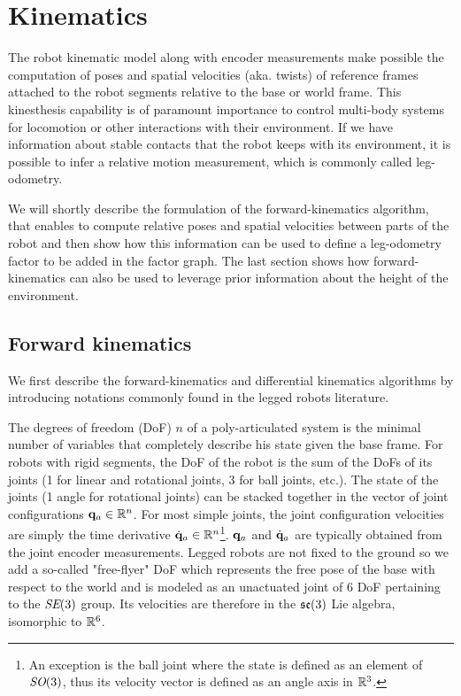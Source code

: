 \chapter{Kinematics}
\minitoc
\bigskip

The robot kinematic model along with encoder measurements make possible the computation of poses and spatial velocities \cite{featherstone2014rigid} (aka. twists) 
of reference frames attached to the robot segments relative to the base or world frame. This kinesthesis capability is of paramount importance to control
multi-body systems for locomotion or other interactions with their environment. If we have information about stable contacts that the robot keeps with
its environment, it is possible to infer a relative motion measurement, which is commonly called leg-odometry.

We will shortly describe the formulation of the forward-kinematics algorithm, that enables to compute relative poses and spatial velocities between parts of the robot
and then show how this information can be used to define a leg-odometry factor to be added in the factor graph. The last section shows how forward-kinematics can also be used to leverage prior 
information about the height of the environment. 



\section{Forward kinematics}
\label{sec:forward_kinematics}
We first describe the forward-kinematics and differential kinematics algorithms by introducing notations commonly found in the legged robots literature.

The degrees of freedom (DoF) $n$ of a poly-articulated system is the minimal number of variables that completely describe his state given the base frame. 
For robots with rigid segments, the DoF of the robot is the sum of the DoFs of its joints (1 for linear and rotational joints, 3 for
ball joints, etc.).
The state of the joints (1 angle for rotational joints) can be stacked together in the vector of joint configurations 
${\bf q}_a \in \mathbb{R}^n$. For most simple joints, the joint configuration velocities are simply the time derivative $\dot{{\bf q}}_a \in \mathbb{R}^n$\footnote{An exception is the ball joint where the 
state is defined as an element of $\textit{SO}(3)$, thus its velocity vector is defined as an angle axis in $\mathbb{R}^3$.}. ${\bf q}_a$ and $\dot{{\bf q}}_a$ are typically obtained from
the joint encoder measurements.
Legged robots are not fixed to the ground so we add a so-called "free-flyer" DoF which represents the free pose of the base with respect to the world and is modeled as an 
unactuated joint of 6 DoF pertaining to the $\textit{SE}(3)$ group. Its velocities are therefore in the ${\mathfrak {se}}(3)$  Lie algebra, isomorphic to $\mathbb{R}^6$. 

